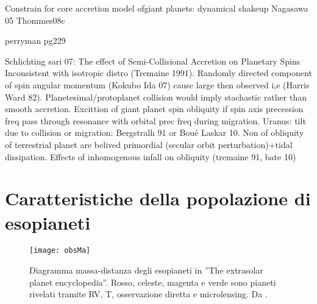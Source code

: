 \begin{workout}

\end{workout}

\begin{workout}
Constrain for core accretion model ofgiant planets: dynamical shakeup Nagasawa 05 Thommes08c
\end{workout}

\begin{workout}
perryman pg229
\end{workout}


\begin{workout}

\end{workout}

\begin{workout}
Schlichting sari 07: The effect of Semi-Collisional Accretion on Planetary Spins
Inconsistent with isotropic distro (Tremaine 1991). Randomly directed component of spin angular momentum (Kokubo Ida 07) cause large then observed i,e (Harris Ward 82).
Planetesimal/protoplanet collision would imply stachastic rather than smooth accretion.
Excittion of giant planet spin obliquity if spin axis precession freq pass through resonance with orbital prec freq during migration.
Uranus: tilt due to collision or migration: Bergstralh 91 or Bou\'e Laskar 10.
Non of obliquity of terrestrial planet are belived primordial (secular orbit perturbation)+tidal dissipation.
Effects of inhomogenous infall on obliquity (tremaine 91, bate 10)
\end{workout}


{\let\clearpage\relax\let\cleardoublepage\relax
\chapter{Caratteristiche della popolazione di esopianeti}
}

\begin{wrapfigure}[5]{l}{0.55\textwidth}
\texttt{[image: obsMa]}\label{fig:Maplot}
\caption{Diagramma massa-distanza degli esopianeti in ''The extrasolar planet encyclopedia''. Rosso, celeste, magenta e verde sono pianeti rivelati tramite RV, T, osservazione diretta e microlensing. Da \cite{mordasini2018}.}
\end{wrapfigure}


